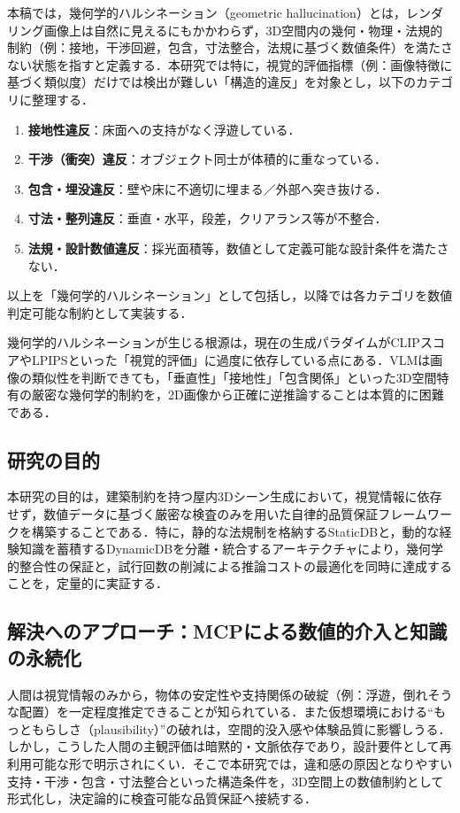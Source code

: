 \documentclass[dvipdfmx, a4paper, 9pt]{deimj}
\begin{document}
本稿では，幾何学的ハルシネーション（geometric hallucination）とは，レンダリング画像上は自然に見えるにもかかわらず，3D空間内の幾何・物理・法規的制約（例：接地，干渉回避，包含，寸法整合，法規に基づく数値条件）を満たさない状態を指すと定義する．本研究では特に，視覚的評価指標（例：画像特徴に基づく類似度）だけでは検出が難しい「構造的違反」を対象とし，以下のカテゴリに整理する．
\begin{enumerate}
    \item[(i)] \textbf{接地性違反}：床面への支持がなく浮遊している．
    \item[(ii)] \textbf{干渉（衝突）違反}：オブジェクト同士が体積的に重なっている．
    \item[(iii)] \textbf{包含・埋没違反}：壁や床に不適切に埋まる／外部へ突き抜ける．
    \item[(iv)] \textbf{寸法・整列違反}：垂直・水平，段差，クリアランス等が不整合．
    \item[(v)] \textbf{法規・設計数値違反}：採光面積等，数値として定義可能な設計条件を満たさない．
\end{enumerate}
以上を「幾何学的ハルシネーション」として包括し，以降では各カテゴリを数値判定可能な制約として実装する．

幾何学的ハルシネーションが生じる根源は，現在の生成パラダイムがCLIPスコア\cite{radford2021clip}やLPIPS\cite{zhang2018lpips}といった「視覚的評価」に過度に依存している点にある．VLMは画像の類似性を判断できても，「垂直性」「接地性」「包含関係」といった3D空間特有の厳密な幾何学的制約を，2D画像から正確に逆推論することは本質的に困難である．

\subsection{研究の目的}

本研究の目的は，建築制約を持つ屋内3Dシーン生成において，視覚情報に依存せず，数値データに基づく厳密な検査のみを用いた自律的品質保証フレームワークを構築することである．特に，静的な法規制を格納するStaticDBと，動的な経験知識を蓄積するDynamicDBを分離・統合するアーキテクチャにより，幾何学的整合性の保証と，試行回数の削減による推論コストの最適化を同時に達成することを，定量的に実証する．

\subsection{解決へのアプローチ：MCPによる数値的介入と知識の永続化}

人間は視覚情報のみから，物体の安定性や支持関係の破綻（例：浮遊，倒れそうな配置）を一定程度推定できることが知られている．また仮想環境における“もっともらしさ（plausibility）”の破れは，空間的没入感や体験品質に影響しうる．しかし，こうした人間の主観評価は暗黙的・文脈依存であり，設計要件として再利用可能な形で明示されにくい．そこで本研究では，違和感の原因となりやすい支持・干渉・包含・寸法整合といった構造条件を，3D空間上の数値制約として形式化し，決定論的に検査可能な品質保証へ接続する．
\end{document}
